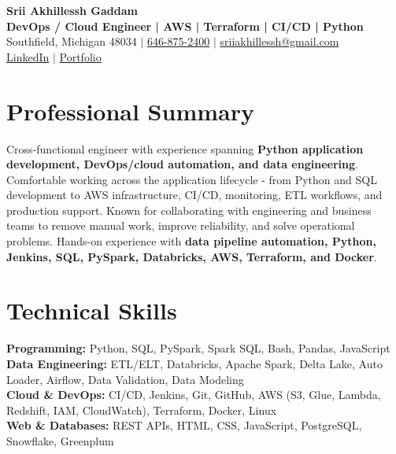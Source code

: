 \documentclass[letterpaper,10pt]{article}
\begin{document}
\fontsize{9.35pt}{10.45pt}\selectfont

\begin{center}
    {\LARGE \textbf{Srii Akhillessh Gaddam}} \\[-1pt]
    \textbf{DevOps / Cloud Engineer | AWS | Terraform | CI/CD | Python} \\[2pt]
    Southfield, Michigan 48034 $|$
    \href{tel:6468752400}{646-875-2400} $|$
    \href{mailto:sriiakhillessh@gmail.com}{sriiakhillessh@gmail.com} \\[1pt]
    \href{https://www.linkedin.com/in/srii-akhiilessh-gaddam-b48668191/}{LinkedIn} $|$
    \href{https://sriiakhillesshg.github.io/portfolio/}{Portfolio}
\end{center}
\vspace{-8pt}

\section{Professional Summary}
\small{Cross-functional engineer with experience spanning \textbf{Python application development, DevOps/cloud automation, and data engineering}. Comfortable working across the application lifecycle - from Python and SQL development to AWS infrastructure, CI/CD, monitoring, ETL workflows, and production support. Known for collaborating with engineering and business teams to remove manual work, improve reliability, and solve operational problems. Hands-on experience with \textbf{data pipeline automation, Python, Jenkins, SQL, PySpark, Databricks, AWS, Terraform, and Docker}.}

\section{Technical Skills}
\small{
\textbf{Programming:} Python, SQL, PySpark, Spark SQL, Bash, Pandas, JavaScript \\
\textbf{Data Engineering:} ETL/ELT, Databricks, Apache Spark, Delta Lake, Auto Loader, Airflow, Data Validation, Data Modeling \\
\textbf{Cloud \& DevOps:} CI/CD, Jenkins, Git, GitHub, AWS (S3, Glue, Lambda, Redshift, IAM, CloudWatch), Terraform, Docker, Linux \\
\textbf{Web \& Databases:} REST APIs, HTML, CSS, JavaScript, PostgreSQL, Snowflake, Greenplum
}
\end{document}
